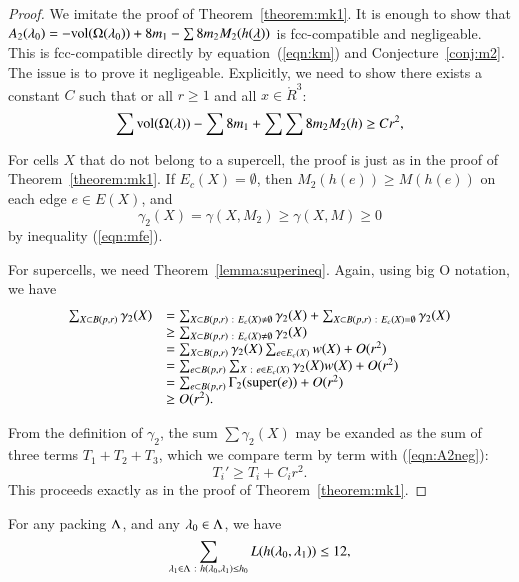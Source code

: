 \begin{proof}  We imitate the proof of Theorem~\ref{theorem:mk1}.
It is enough to show that $A_2(\lambda_0)  = -{\operatorname{vol}}(\Omega(\lambda_0)) + 8 m_1 - \sum 8 m_2 M_2(h({\underline{\lambda}}))$ is fcc-compatible and negligeable. 
This is fcc-compatible directly
by equation~(\ref{eqn:km})
and Conjecture~\ref{conj:m2}.  The issue is to prove it negligeable.  Explicitly, we need
to show there exists a constant  $C$ such that or all $r\ge 1$ and all $x\in\ring{R}^3$:
\begin{equation}\label{eqn:A2neg}
  \sum {\operatorname{vol}}(\Omega(\lambda)) -\sum 8m_1 + \sum \sum 8 m_2 M_2(h) \ge C r^2,
\end{equation}

For cells $X$ that do not belong to a supercell,
the proof is just as in the proof of Theorem~\ref{theorem:mk1}.
If $E_c(X)=\emptyset$, then 
$M_2(h(e))\ge M(h(e))$ on each edge $e\in E(X)$, and
$$\gamma_2(X)=\gamma(X,M_2)\ge \gamma(X,M)\ge 0$$ 
by inequality (\ref{eqn:mfe}).

For supercells, we need Theorem~\ref{lemma:superineq}.
Again, using big O notation, we have
$$
\begin{array}{lll}
\sum_{X\subset B(p,r)} \gamma_2(X) &= 
\sum_{X\subset B(p,r)\ :\  E_c(X)\ne\emptyset} \gamma_2(X) +
\sum_{X\subset B(p,r)\ :\  E_c(X)=\emptyset} \gamma_2(X) \\
&\ge \sum_{X\subset B(p,r)\ :\  E_c(X)\ne\emptyset} \gamma_2(X) \\
&=\sum_{X\subset B(p,r)}\gamma_2(X)\sum_{e \in E_c(X)}w(X) + O(r^2)\\
&=\sum_{e\subset B(p,r)}\sum_{X\ :\  e \in E_c(X)}\gamma_2(X)w(X) + O(r^2)\\
&=\sum_{e\subset B(p,r)}\Gamma_2({\operatorname{super}}(e)) + O(r^2)\\
&\ge O(r^2).
\end{array}
$$

From the definition of $\gamma_2$, the sum $\sum \gamma_2(X)$ may be exanded as the sum of three terms $T_1+T_2+T_3$, which we compare term by term with (\ref{eqn:A2neg}):
$$
T_i' \ge T_i + C_i r^2.
$$
This proceeds exactly as in the proof of Theorem~\ref{theorem:mk1}.
\end{proof}



\begin{conjecture} \label{conj:L12} 
For any packing $\Lambda$, and
any $\lambda_0\in\Lambda$, we have
\begin{equation}\label{eqn:L12}
\sum_{\lambda_1\in\Lambda\ :\  h(\lambda_0,\lambda_1)\le {h_0}} L(h(\lambda_0,\lambda_1)) \le 12,
\end{equation}
\end{conjecture}

